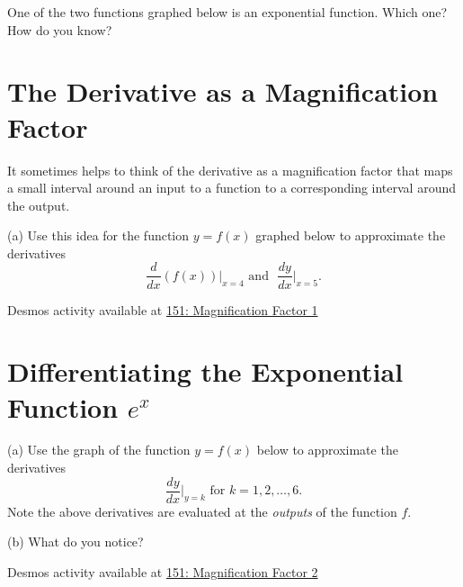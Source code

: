 \documentclass{ximera}
\begin{document}
\begin{question} \label{Qdcvbrtt}
One of the two functions graphed below is an exponential function. Which one? How do you know?
\end{question}



\section*{The Derivative as a Magnification Factor}
\begin{exploration}   \label{Ex:325gyt}

It sometimes helps to think of the derivative as a magnification factor that maps a small interval around an input to a function to a corresponding interval around the output.

(a) Use this idea for the function $y=f(x)$ graphed below to approximate the derivatives 
\[
    \frac{d}{dx} (f(x))\Big|_{x=4} \text{  and  } \,\, \frac{dy}{dx}\Big|_{x=5} .
\]


\begin{onlineOnly}
    \begin{center}
\end{center}
\end{onlineOnly}


Desmos activity available at \href{https://www.desmos.com/calculator/la4f5ots3r}{151: Magnification Factor 1}

\end{exploration}


\section*{Differentiating the Exponential Function $e^x$}

\begin{exploration}

(a) Use the graph of the function $y=f(x)$ below to approximate the derivatives 
\[
    \frac{dy}{dx}\Big|_{y=k} \text{ for } k=1, 2, \ldots , 6.
\]
Note the above derivatives are evaluated at the \emph{outputs} of the function $f$. 

(b) What do  you notice?

\begin{onlineOnly}
    \begin{center}
\end{center}
\end{onlineOnly}


Desmos activity available at \href{https://www.desmos.com/calculator/k08dphtuca}{151: Magnification Factor 2}


\end{exploration}
\end{document}

